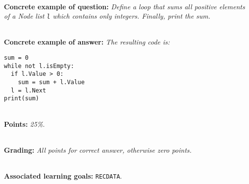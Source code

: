 \ \\ 

\textbf{Concrete example of question:} \textit{Define a loop that sums all positive elements of a Node list \texttt{l} which contains only integers. Finally, print the sum.}

\ \\ 

\textbf{Concrete example of answer:} \textit{The resulting code is:}

\begin{lstlisting}
sum = 0
while not l.isEmpty:
  if l.Value > 0:
    sum = sum + l.Value
  l = l.Next
print(sum)
\end{lstlisting}

\ \\ 

\textbf{Points:} \textit{25\%.}

\ \\ 

\textbf{Grading:} \textit{All points for correct answer, otherwise zero points.}

\ \\ 

\textbf{Associated learning goals:} \texttt{RECDATA}.

\ \\
